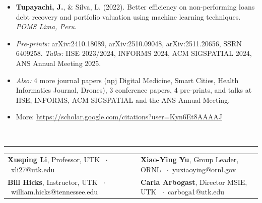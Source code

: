 \documentclass[10pt,a4paper]{extarticle}
\newcommand{\sect}[2][]{\needspace{45pt}\vspace{9pt}%
  {\color{navy}\bfseries\large\textls[60]{\MakeUppercase{#2}}}{\color{muted}\small\ #1}\\[-6.5pt]
  {\color{navy}\rule{\linewidth}{0.5pt}}\par\vspace{-1pt}}
\newcommand{\m}[1]{\textbf{#1}}
\begin{document}
\begin{itemize}[itemsep=1.2pt]
\item \m{Tupayachi, J.}, \& Silva, L. (2022). Better efficiency on non-performing loans debt recovery and portfolio valuation using machine learning techniques. \textit{POMS Lima, Peru}.
\item \textit{Pre-prints:} arXiv:2410.18089, arXiv:2510.09048, arXiv:2511.20656, SSRN 6409258. \textit{Talks:} IISE 2023/2024, INFORMS 2024, ACM SIGSPATIAL 2024, ANS Annual Meeting 2025.
\else
\item \textit{Also:} 4 more journal papers (npj Digital Medicine, Smart Cities, Health Informatics Journal, Drones), 3 conference papers, 4 pre-prints, and talks at IISE, INFORMS, ACM SIGSPATIAL and the ANS Annual Meeting. 
\item More: \url{https://scholar.google.com/citations?user=Kyn6Et8AAAAJ}
\fi
\end{itemize}

\sect{References}
\noindent\begin{tabularx}{\linewidth}{@{}X X@{}}
\textbf{Xueping Li}, Professor, UTK \ $\cdot$\ xli27@utk.edu &
\textbf{Xiao-Ying Yu}, Group Leader, ORNL \ $\cdot$\ yuxiaoying@ornl.gov \\
\textbf{Bill Hicks}, Instructor, UTK \ $\cdot$\ william.hicks@tennessee.edu &
\textbf{Carla Arbogast}, Director MSIE, UTK \ $\cdot$\ carboga1@utk.edu
\end{tabularx}
\end{document}
